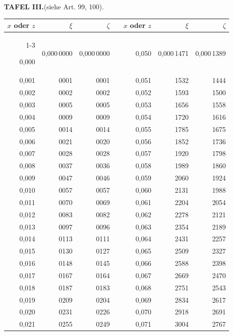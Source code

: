 \clearpage
{}
\begingroup
\centering
\fontsize{9}{9}\selectfont
\setlength{\tabcolsep}{8pt}
\renewcommand{\arraystretch}{1}
\setlength{\parskip}{0pt}
\textbf{TAFEL III.}\quad (siehe Art. 99, 100).
\par\vspace{7pt}
\begin{tabular}{|r|r|r|@{}p{9pt}@{}|r|r|r|}
\hline
\rule{0pt}{8.5pt}\(x\) oder \(z\) & \(\xi\) & \(\zeta\) & & \(x\) oder \(z\) & \(\xi\) & \(\zeta\) \\
\cline{1-3}\cline{5-7}
\rule{0pt}{8.5pt}0,000 & 0,000\,0000 & 0,000\,0000 &  & 0,050 & 0,000\,1471 & 0,000\,1389 \\
0,001 & 0001 & 0001 &  & 0,051 & 1532 & 1444 \\
0,002 & 0002 & 0002 &  & 0,052 & 1593 & 1500 \\
0,003 & 0005 & 0005 &  & 0,053 & 1656 & 1558 \\
0,004 & 0009 & 0009 &  & 0,054 & 1720 & 1616 \\
0,005 & 0014 & 0014 &  & 0,055 & 1785 & 1675 \\[3pt]
0,006 & 0021 & 0020 &  & 0,056 & 1852 & 1736 \\
0,007 & 0028 & 0028 &  & 0,057 & 1920 & 1798 \\
0,008 & 0037 & 0036 &  & 0,058 & 1989 & 1860 \\
0,009 & 0047 & 0046 &  & 0,059 & 2060 & 1924 \\
0,010 & 0057 & 0057 &  & 0,060 & 2131 & 1988 \\[3pt]
0,011 & 0070 & 0069 &  & 0,061 & 2204 & 2054 \\
0,012 & 0083 & 0082 &  & 0,062 & 2278 & 2121 \\
0,013 & 0097 & 0096 &  & 0,063 & 2354 & 2189 \\
0,014 & 0113 & 0111 &  & 0,064 & 2431 & 2257 \\
0,015 & 0130 & 0127 &  & 0,065 & 2509 & 2327 \\[3pt]
0,016 & 0148 & 0145 &  & 0,066 & 2588 & 2398 \\
0,017 & 0167 & 0164 &  & 0,067 & 2669 & 2470 \\
0,018 & 0187 & 0183 &  & 0,068 & 2751 & 2543 \\
0,019 & 0209 & 0204 &  & 0,069 & 2834 & 2617 \\
0,020 & 0231 & 0226 &  & 0,070 & 2918 & 2691 \\[3pt]
0,021 & 0255 & 0249 &  & 0,071 & 3004 & 2767 \\

\end{tabular}
